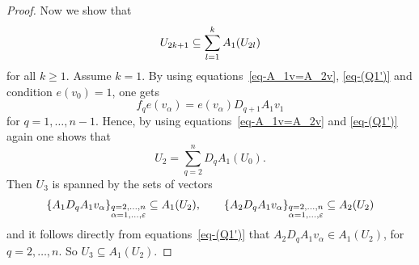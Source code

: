 \documentclass[pdftex]{sigma}
\numberwithin{equation}{section}
\begin{document}
\begin{proof}
Now we show that
\begin{equation}
U_{2k+1}\subseteq \sum_{l=1}^{k}A_{1}(U_{2l})
\label{eq-V_(2k+1)-in-imA_{1}}
\end{equation}
for all $k\geq 1$.
Assume $k=1$. By using equations~\eqref{eq-A_1v=A_2v}, \eqref{eq-(Q1')} and condition $e(v_{0})=1$, one gets
\begin{equation*}
f_{q}e(v_{\alpha})=e(v_{\alpha})D_{q+1}A_{1}v_{1}
\end{equation*}
for $q=1,\dots,n-1$. Hence, by using equations~\eqref{eq-A_1v=A_2v} and \eqref{eq-(Q1')} again one shows that
\begin{equation*}
U_{2}= \sum_{q=2}^{n}D_{q}A_{1}(U_{0}) .
\end{equation*}
 Then $U_{3}$ is spanned by the sets of vectors
\begin{equation*}
\{A_{1}D_{q}A_{1}v_{\alpha}\}_{\begin{subarray}{l} q=2,\dots,n \\ \alpha=1,\dots,\varepsilon \end{subarray}}\subseteq A_{1}(U_{2}) ,\qquad
\{A_{2}D_{q}A_{1}v_{\alpha}\}_{\begin{subarray}{l} q=2,\dots,n \\ \alpha=1,\dots,\varepsilon \end{subarray}}\subseteq A_{2}(U_{2})
\end{equation*}
and it follows directly from equations~\eqref{eq-(Q1')} that
$A_{2}D_{q}A_{1}v_{\alpha} \in A_{1}(U_{2})$, for $q=2,\dots,n$. So $U_3\subseteq A_1(U_2)$.


\end{proof}
\end{document}
